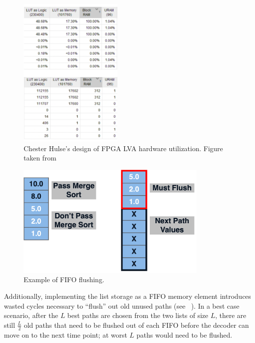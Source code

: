 \begin{figure}
\centering\CaptionFontSize
\includegraphics[height=20em]
{Figures/old_design_utilization.png}
\caption[Chester Hulse's design of FPGA LVA hardware utilization]
{Chester Hulse's design of FPGA LVA hardware utilization. Figure taken from \cite{ChesterPaper}}
\label{Figure:DecoderHW:OldUtilization}
\end{figure}

\begin{figure}
\centering\CaptionFontSize
\includegraphics[height=15em]
{Figures/fifo_flush.png}
\caption[Example of FIFO flushing]
{Example of FIFO flushing.}
\label{Figure:DecoderHW:FifoFlushing}
\end{figure}

Additionally, implementing the list storage as a FIFO memory element introduces wasted cycles necessary to “flush” out old unused paths (see \Figure~). In a best case scenario, after the $L$ best paths are chosen from the two lists of size $L$, there are still $\frac{L}{2}$ old paths that need to be flushed out of each FIFO before the decoder can move on to the next time point; at worst $L$ paths would need to be flushed.

